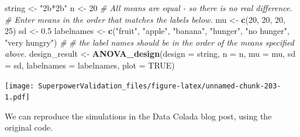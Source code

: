 \documentclass[]{book}
\newenvironment{Shaded}{\begin{snugshade}}{\end{snugshade}}
\newcommand{\CommentTok}[1]{\textcolor[rgb]{0.56,0.35,0.01}{\textit{#1}}}
\newcommand{\DataTypeTok}[1]{\textcolor[rgb]{0.13,0.29,0.53}{#1}}
\newcommand{\DecValTok}[1]{\textcolor[rgb]{0.00,0.00,0.81}{#1}}
\newcommand{\FloatTok}[1]{\textcolor[rgb]{0.00,0.00,0.81}{#1}}
\newcommand{\KeywordTok}[1]{\textcolor[rgb]{0.13,0.29,0.53}{\textbf{#1}}}
\newcommand{\NormalTok}[1]{#1}
\newcommand{\OtherTok}[1]{\textcolor[rgb]{0.56,0.35,0.01}{#1}}
\newcommand{\StringTok}[1]{\textcolor[rgb]{0.31,0.60,0.02}{#1}}
\begin{document}
\begin{Shaded}
\begin{Highlighting}[]
\NormalTok{string <-}\StringTok{ "2b*2b"}
\NormalTok{n <-}\StringTok{ }\DecValTok{20}
\CommentTok{# All means are equal - so there is no real difference.}
\CommentTok{# Enter means in the order that matches the labels below.}
\NormalTok{mu <-}\StringTok{ }\KeywordTok{c}\NormalTok{(}\DecValTok{20}\NormalTok{, }\DecValTok{20}\NormalTok{, }\DecValTok{20}\NormalTok{, }\DecValTok{25}\NormalTok{) }
\NormalTok{sd <-}\StringTok{ }\FloatTok{0.5}
\NormalTok{labelnames <-}\StringTok{ }\KeywordTok{c}\NormalTok{(}\StringTok{"fruit"}\NormalTok{, }\StringTok{"apple"}\NormalTok{, }\StringTok{"banana"}\NormalTok{, }
                \StringTok{"hunger"}\NormalTok{, }\StringTok{"no hunger"}\NormalTok{, }\StringTok{"very hungry"}\NormalTok{) }\CommentTok{#}
\CommentTok{# the label names should be in the order of the means specified above.}
\NormalTok{design_result <-}\StringTok{ }\KeywordTok{ANOVA_design}\NormalTok{(}\DataTypeTok{design =}\NormalTok{ string,}
                   \DataTypeTok{n =}\NormalTok{ n, }
                   \DataTypeTok{mu =}\NormalTok{ mu, }
                   \DataTypeTok{sd =}\NormalTok{ sd, }
                   \DataTypeTok{labelnames =}\NormalTok{ labelnames,}
                   \DataTypeTok{plot =} \OtherTok{TRUE}\NormalTok{)}
\end{Highlighting}
\end{Shaded}

\texttt{[image: SuperpowerValidation\_files/figure-latex/unnamed-chunk-203-1.pdf]}

We can reproduce the simulations in the Data Colada blog post, using the original code.
\end{document}
